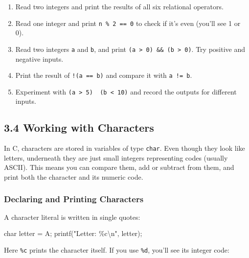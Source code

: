 \documentclass[
  letterpaper,
  DIV=11,
  numbers=noendperiod]{scrreprt}
\newenvironment{Shaded}{\begin{snugshade}}{\end{snugshade}}
\newcommand{\CharTok}[1]{\textcolor[rgb]{0.13,0.47,0.30}{#1}}
\newcommand{\DataTypeTok}[1]{\textcolor[rgb]{0.68,0.00,0.00}{#1}}
\newcommand{\NormalTok}[1]{\textcolor[rgb]{0.00,0.23,0.31}{#1}}
\newcommand{\OperatorTok}[1]{\textcolor[rgb]{0.37,0.37,0.37}{#1}}
\newcommand{\SpecialCharTok}[1]{\textcolor[rgb]{0.37,0.37,0.37}{#1}}
\newcommand{\StringTok}[1]{\textcolor[rgb]{0.13,0.47,0.30}{#1}}
\providecommand{\tightlist}{%
  \setlength{\itemsep}{0pt}\setlength{\parskip}{0pt}}
\begin{document}
\begin{enumerate}
\def\labelenumi{\arabic{enumi}.}
\tightlist
\item
  Read two integers and print the results of all six relational
  operators.
\item
  Read one integer and print \texttt{n\ \%\ 2\ ==\ 0} to check if it's
  even (you'll see 1 or 0).
\item
  Read two integers \texttt{a} and \texttt{b}, and print
  \texttt{(a\ \textgreater{}\ 0)\ \&\&\ (b\ \textgreater{}\ 0)}. Try
  positive and negative inputs.
\item
  Print the result of \texttt{!(a\ ==\ b)} and compare it with
  \texttt{a\ !=\ b}.
\item
  Experiment with
  \texttt{(a\ \textgreater{}\ 5)\ \textbar{}\textbar{}\ (b\ \textless{}\ 10)}
  and record the outputs for different inputs.
\end{enumerate}

\subsection{3.4 Working with Characters}\label{working-with-characters}

In C, characters are stored in variables of type \texttt{char}. Even
though they look like letters, underneath they are just small integers
representing codes (usually ASCII). This means you can compare them, add
or subtract from them, and print both the character and its numeric
code.

\subsubsection{Declaring and Printing
Characters}\label{declaring-and-printing-characters}

A character literal is written in single quotes:

\begin{Shaded}
\begin{Highlighting}[]
\DataTypeTok{char}\NormalTok{ letter }\OperatorTok{=} \CharTok{\textquotesingle{}A\textquotesingle{}}\OperatorTok{;}
\NormalTok{printf}\OperatorTok{(}\StringTok{"Letter: }\SpecialCharTok{\%c\textbackslash{}n}\StringTok{"}\OperatorTok{,}\NormalTok{ letter}\OperatorTok{);}
\end{Highlighting}
\end{Shaded}

Here \texttt{\%c} prints the character itself. If you use \texttt{\%d},
you'll see its integer code:
\end{document}
